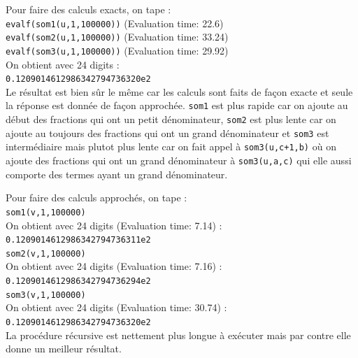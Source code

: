\documentclass[a4paper,11pt]{book}
\begin{document}
Pour faire des calculs exacts, on tape :\\
{\tt evalf(som1(u,1,100000))} (Evaluation time: 22.6)\\
{\tt evalf(som2(u,1,100000))} (Evaluation time: 33.24)\\
{\tt evalf(som3(u,1,100000))} (Evaluation time: 29.92)\\
On obtient avec 24 digits :\\
{\tt 0.1209014612986342794736320e2}\\
Le r\'esultat est bien s\^ur le m\^eme car les calculs sont faits de fa\c{c}on
exacte et seule la r\'eponse est donn\'ee de fa\c{c}on approch\'ee. {\tt som1} est plus rapide car on ajoute au d\'ebut des fractions qui 
ont un  petit d\'enominateur, {\tt som2} est plus lente car on ajoute au 
toujours des fractions qui ont un grand d\'enominateur et {\tt som3} est 
interm\'ediaire mais plutot plus lente car on fait appel \`a {\tt som3(u,c+1,b)}
o\`u on ajoute des fractions qui ont un grand d\'enominateur \`a
{\tt som3(u,a,c)} qui elle aussi comporte des termes ayant un grand 
d\'enominateur.

Pour faire des calculs approch\'es, on tape :\\
{\tt som1(v,1,100000)}\\
On obtient  avec 24 digits (Evaluation time: 7.14) :\\
{\tt 0.1209014612986342794736311e2}\\
{\tt som2(v,1,100000)} \\
On obtient avec 24 digits (Evaluation time: 7.16) :\\
{\tt 0.1209014612986342794736294e2}\\
{\tt som3(v,1,100000)} \\
On obtient avec 24 digits  (Evaluation time: 30.74) :\\
{\tt 0.1209014612986342794736320e2}\\
La proc\'edure r\'ecursive est nettement plus longue \`a ex\'ecuter mais par 
contre elle donne un meilleur r\'esultat.
\end{document}
